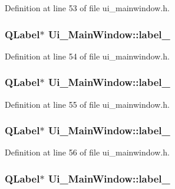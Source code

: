 Definition at line 53 of file ui\_\-mainwindow.h.

\hypertarget{classUi__MainWindow_a663f728e6244926a795c6e6892673b1d}{
\subsubsection[{label\_\-6}]{\setlength{\rightskip}{0pt plus 5cm}QLabel$\ast$ {\bf Ui\_\-MainWindow::label\_}}}
\label{classUi__MainWindow_a663f728e6244926a795c6e6892673b1d}


Definition at line 54 of file ui\_\-mainwindow.h.

\hypertarget{classUi__MainWindow_a13936e6f18b1c90402b3c7a3c92b6cdb}{
\subsubsection[{label\_\-7}]{\setlength{\rightskip}{0pt plus 5cm}QLabel$\ast$ {\bf Ui\_\-MainWindow::label\_}}}
\label{classUi__MainWindow_a13936e6f18b1c90402b3c7a3c92b6cdb}


Definition at line 55 of file ui\_\-mainwindow.h.

\hypertarget{classUi__MainWindow_af183bfbfb9f38bbdd60caf92b15e23dc}{
\subsubsection[{label\_\-8}]{\setlength{\rightskip}{0pt plus 5cm}QLabel$\ast$ {\bf Ui\_\-MainWindow::label\_}}}
\label{classUi__MainWindow_af183bfbfb9f38bbdd60caf92b15e23dc}


Definition at line 56 of file ui\_\-mainwindow.h.

\hypertarget{classUi__MainWindow_a0e90c7e9ad77386881e0b264ddb9dd22}{
\subsubsection[{label\_\-9}]{\setlength{\rightskip}{0pt plus 5cm}QLabel$\ast$ {\bf Ui\_\-MainWindow::label\_}}}
\label{classUi__MainWindow_a0e90c7e9ad77386881e0b264ddb9dd22}


